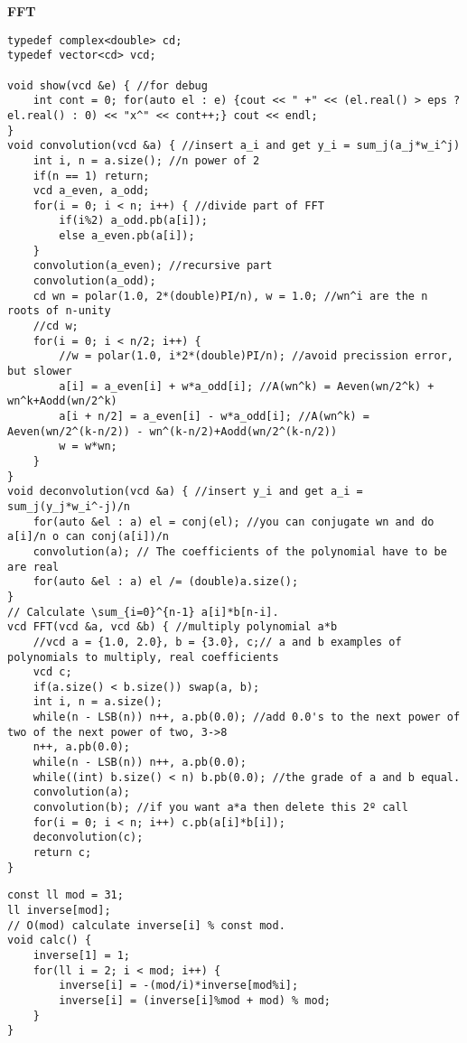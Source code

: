 \documentclass[a4paper,10pt]{article}
\newcommand{\titleAlg}[1]{\vspace{-10pt}
\begin{center}\textbf{#1}\end{center} \vspace{-10pt}}
\begin{document}
\titleAlg{FFT}
\begin{multicols}{2}
\begin{verbatim}
typedef complex<double> cd;
typedef vector<cd> vcd;

void show(vcd &e) { //for debug
    int cont = 0; for(auto el : e) {cout << " +" << (el.real() > eps ? el.real() : 0) << "x^" << cont++;} cout << endl;
}
void convolution(vcd &a) { //insert a_i and get y_i = sum_j(a_j*w_i^j)
    int i, n = a.size(); //n power of 2
    if(n == 1) return;
    vcd a_even, a_odd;
    for(i = 0; i < n; i++) { //divide part of FFT
        if(i%2) a_odd.pb(a[i]);
        else a_even.pb(a[i]);
    }
    convolution(a_even); //recursive part
    convolution(a_odd);
    cd wn = polar(1.0, 2*(double)PI/n), w = 1.0; //wn^i are the n roots of n-unity
    //cd w;
    for(i = 0; i < n/2; i++) {
        //w = polar(1.0, i*2*(double)PI/n); //avoid precission error, but slower
        a[i] = a_even[i] + w*a_odd[i]; //A(wn^k) = Aeven(wn/2^k) + wn^k+Aodd(wn/2^k)
        a[i + n/2] = a_even[i] - w*a_odd[i]; //A(wn^k) = Aeven(wn/2^(k-n/2)) - wn^(k-n/2)+Aodd(wn/2^(k-n/2))
        w = w*wn;
    }
}
void deconvolution(vcd &a) { //insert y_i and get a_i = sum_j(y_j*w_i^-j)/n
    for(auto &el : a) el = conj(el); //you can conjugate wn and do a[i]/n o can conj(a[i])/n
    convolution(a); // The coefficients of the polynomial have to be are real
    for(auto &el : a) el /= (double)a.size();
}
// Calculate \sum_{i=0}^{n-1} a[i]*b[n-i].
vcd FFT(vcd &a, vcd &b) { //multiply polynomial a*b
    //vcd a = {1.0, 2.0}, b = {3.0}, c;// a and b examples of polynomials to multiply, real coefficients
    vcd c;
    if(a.size() < b.size()) swap(a, b);
    int i, n = a.size();
    while(n - LSB(n)) n++, a.pb(0.0); //add 0.0's to the next power of two of the next power of two, 3->8
    n++, a.pb(0.0);
    while(n - LSB(n)) n++, a.pb(0.0);
    while((int) b.size() < n) b.pb(0.0); //the grade of a and b equal.
    convolution(a);
    convolution(b); //if you want a*a then delete this 2º call
    for(i = 0; i < n; i++) c.pb(a[i]*b[i]);
    deconvolution(c);
    return c;
}
\end{verbatim}
\end{multicols}

\begin{multicols}{2}
\begin{verbatim}
const ll mod = 31;
ll inverse[mod]; 
// O(mod) calculate inverse[i] % const mod.
void calc() {
    inverse[1] = 1;
    for(ll i = 2; i < mod; i++) {
        inverse[i] = -(mod/i)*inverse[mod%i];
        inverse[i] = (inverse[i]%mod + mod) % mod;
    }
}
\end{verbatim}
\end{multicols}
\end{document}
